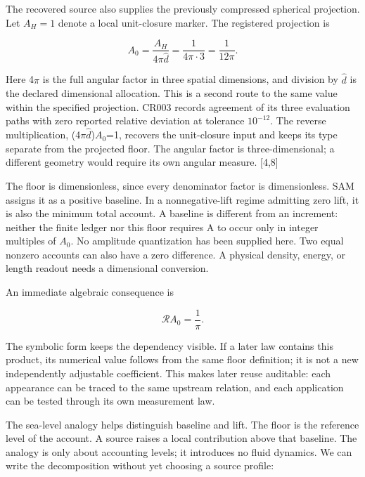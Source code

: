 \documentclass[10pt,twocolumn,letterpaper]{article}
\begin{document}
The recovered source also supplies the previously compressed spherical projection. Let \(A_H=1\) denote a local unit-closure marker. The registered projection is

\begin{equation}
A_0=\frac{A_H}{4\pi\hat d}
=\frac1{4\pi\cdot3}=\frac1{12\pi}.
\end{equation}

Here 4\(\pi\) is the full angular factor in three spatial dimensions, and division by \(\hat d\) is the declared dimensional allocation. This is a second route to the same value within the specified projection. CR003 records agreement of its three evaluation paths with zero reported relative deviation at tolerance \(10^{-12}\). The reverse multiplication, (4\(\pi\)\(\hat d\))\(A_0\)=1, recovers the unit-closure input and keeps its type separate from the projected floor. The angular factor is three-dimensional; a different geometry would require its own angular measure. {[}4,8{]}

The floor is dimensionless, since every denominator factor is dimensionless. SAM assigns it as a positive baseline. In a nonnegative-lift regime admitting zero lift, it is also the minimum total account. A baseline is different from an increment: neither the finite ledger nor this floor requires A to occur only in integer multiples of \(A_0\). No amplitude quantization has been supplied here. Two equal nonzero accounts can also have a zero difference. A physical density, energy, or length readout needs a dimensional conversion.

An immediate algebraic consequence is

\begin{equation}
\mathcal R A_0=\frac1\pi.
\end{equation}

The symbolic form keeps the dependency visible. If a later law contains this product, its numerical value follows from the same floor definition; it is not a new independently adjustable coefficient. This makes later reuse auditable: each appearance can be traced to the same upstream relation, and each application can be tested through its own measurement law.

The sea-level analogy helps distinguish baseline and lift. The floor is the reference level of the account. A source raises a local contribution above that baseline. The analogy is only about accounting levels; it introduces no fluid dynamics. We can write the decomposition without yet choosing a source profile:
\end{document}
